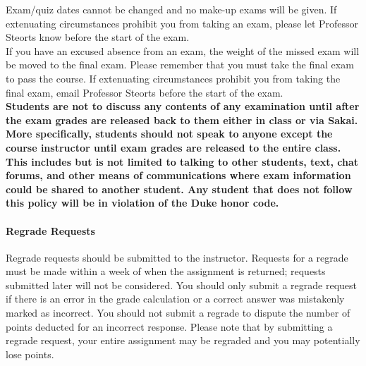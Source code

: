 \documentclass[11pt]{article}
\begin{document}
Exam/quiz dates cannot be changed and no make-up exams will be given. If extenuating circumstances prohibit you from taking an exam, please let Professor Steorts know before the start of the exam.\\

If you have an excused absence from an exam, the weight of the missed exam will be moved to the final exam. Please remember that you must take the final exam to pass the course. If extenuating circumstances prohibit you from taking the final exam, email Professor Steorts before the start of the exam. \\

\textbf{Students are not to discuss any contents of any examination until after the exam grades are released back to them either in class or via Sakai. More specifically, students should not speak to anyone except the course instructor until exam grades are released to the entire class. This includes but is not limited to talking to other students, text, chat forums, and other means of communications where exam information could be shared to another student. Any student that does not follow this policy will be in violation of the Duke honor code.}\\

\paragraph{Regrade Requests}

Regrade requests should be submitted to the instructor. Requests for a regrade must be made within a week of when the assignment is returned; requests submitted later will not be considered. You should only submit a regrade request if there is an error in the grade calculation or a correct answer was mistakenly marked as incorrect. You should not submit a regrade to dispute the number of points deducted for an incorrect response. Please note that by submitting a regrade request, your entire assignment may be regraded and you may potentially lose points.\\
\end{document}
